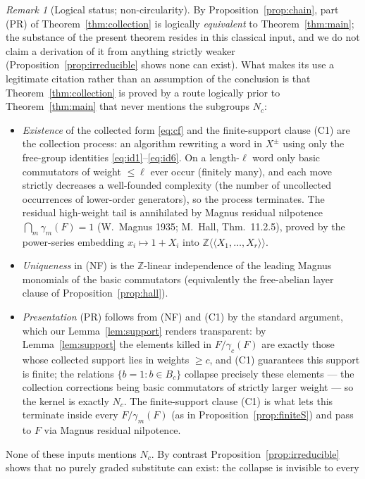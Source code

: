 \documentclass{amsart}
\theoremstyle{definition}
\theoremstyle{remark}
\newtheorem{remark}{Remark}
\begin{document}
\begin{remark}[Logical status; non-circularity]\label{rem:noncirc}
By Proposition~\ref{prop:chain}, part (PR) of Theorem~\ref{thm:collection} is logically
\emph{equivalent} to Theorem~\ref{thm:main}; the substance of the present theorem resides
in this classical input, and we do not claim a derivation of it from anything strictly
weaker (Proposition~\ref{prop:irreducible} shows none can exist). What makes its use a
legitimate citation rather than an assumption of the conclusion is that
Theorem~\ref{thm:collection} is proved by a route logically prior to
Theorem~\ref{thm:main} that never mentions the subgroups $N_c$:
\begin{itemize}
\item \emph{Existence} of the collected form \eqref{eq:cf} and the finite-support clause
(C1) are the collection process: an algorithm rewriting a word in $X^{\pm}$ using only
the free-group identities \eqref{eq:id1}--\eqref{eq:id6}. On a length-$\ell$ word only
basic commutators of weight $\le\ell$ ever occur (finitely many), and each move strictly
decreases a well-founded complexity (the number of uncollected occurrences of
lower-order generators), so the process terminates. The residual high-weight tail is
annihilated by Magnus residual nilpotence $\bigcap_m\gamma_m(F)=1$ (W.~Magnus 1935;
M.~Hall, Thm.~11.2.5), proved by the power-series embedding
$x_i\mapsto1+X_i$ into $\mathbb Z\langle\langle X_1,\dots,X_r\rangle\rangle$.
\item \emph{Uniqueness} in (NF) is the $\mathbb Z$-linear independence of the leading
Magnus monomials of the basic commutators (equivalently the free-abelian layer clause of
Proposition~\ref{prop:hall}).
\item \emph{Presentation} (PR) follows from (NF) and (C1) by the standard argument,
which our Lemma~\ref{lem:support} renders transparent: by Lemma~\ref{lem:support} the
elements killed in $F/\gamma_c(F)$ are exactly those whose collected support lies in
weights $\ge c$, and (C1) guarantees this support is finite; the relations
$\{b=1:b\in B_c\}$ collapse precisely these elements --- the collection corrections being
basic commutators of strictly larger weight --- so the kernel is exactly $N_c$. The
finite-support clause (C1) is what lets this terminate inside every $F/\gamma_m(F)$
(as in Proposition~\ref{prop:finiteS}) and pass to $F$ via Magnus residual nilpotence.
\end{itemize}
None of these inputs mentions $N_c$. By contrast Proposition~\ref{prop:irreducible}
shows that no purely graded substitute can exist: the collapse is invisible to every

\end{remark}
\end{document}
